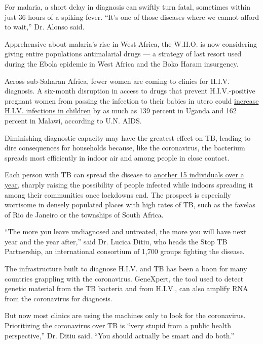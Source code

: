 For malaria, a short delay in diagnosis can swiftly turn fatal,
sometimes within just 36 hours of a spiking fever. ``It's one of those
diseases where we cannot afford to wait,'' Dr. Alonso said.

Apprehensive about malaria's rise in West Africa, the W.H.O. is now
considering giving entire populations antimalarial drugs --- a strategy
of last resort used during the Ebola epidemic in West Africa and the
Boko Haram insurgency.

Across sub-Saharan Africa, fewer women are coming to clinics for H.I.V.
diagnosis. A six-month disruption in access to drugs that prevent
H.I.V.-positive pregnant women from passing the infection to their
babies in utero could
\href{https://reliefweb.int/report/world/estimation-potential-impact-covid-19-responses-hiv-epidemic-analysis-using-goals-model}{increase
H.I.V. infections in children} by as much as 139 percent in Uganda and
162 percent in Malawi, according to U.N. AIDS.

Diminishing diagnostic capacity may have the greatest effect on TB,
leading to dire consequences for households because, like the
coronavirus, the bacterium spreads most efficiently in indoor air and
among people in close contact.

Each person with TB can spread the disease to
\href{https://www.who.int/news-room/fact-sheets/detail/tuberculosis}{another
15 individuals over a year}, sharply raising the possibility of people
infected while indoors spreading it among their communities once
lockdowns end. The prospect is especially worrisome in densely populated
places with high rates of TB, such as the favelas of Rio de Janeiro or
the townships of South Africa.

``The more you leave undiagnosed and untreated, the more you will have
next year and the year after,'' said Dr. Lucica Ditiu, who heads the
Stop TB Partnership, an international consortium of 1,700 groups
fighting the disease.

The infrastructure built to diagnose H.I.V. and TB has been a boon for
many countries grappling with the coronavirus. GeneXpert, the tool used
to detect genetic material from the TB bacteria and from H.I.V., can
also amplify RNA from the coronavirus for diagnosis.

But now most clinics are using the machines only to look for the
coronavirus. Prioritizing the coronavirus over TB is ``very stupid from
a public health perspective,'' Dr. Ditiu said. ``You should actually be
smart and do both.''

